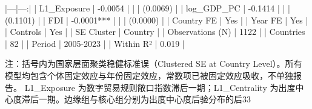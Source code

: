 |---|---:|
| L1_Exposure | -0.0054 |
|  | (0.0069) |
| log_GDP_PC | -0.1414 |
|  | (0.1101) |
| FDI | -0.0001*** |
|  | (0.0000) |
| Country FE | Yes |
| Year FE | Yes |
| Controls | Yes |
| SE Cluster | Country |
| Observations (N) | 1122 |
| Countries | 82 |
| Period | 2005-2023 |
| Within R² | 0.019 |

注：括号内为国家层面聚类稳健标准误（Clustered SE at Country Level）。所有模型均包含个体固定效应与年份固定效应，常数项已被固定效应吸收，不单独报告。
L1_Exposure 为数字贸易规则敞口指数滞后一期；L1_Centrality 为出度中心度滞后一期。边缘组与核心组分别为出度中心度后验分布的后33%